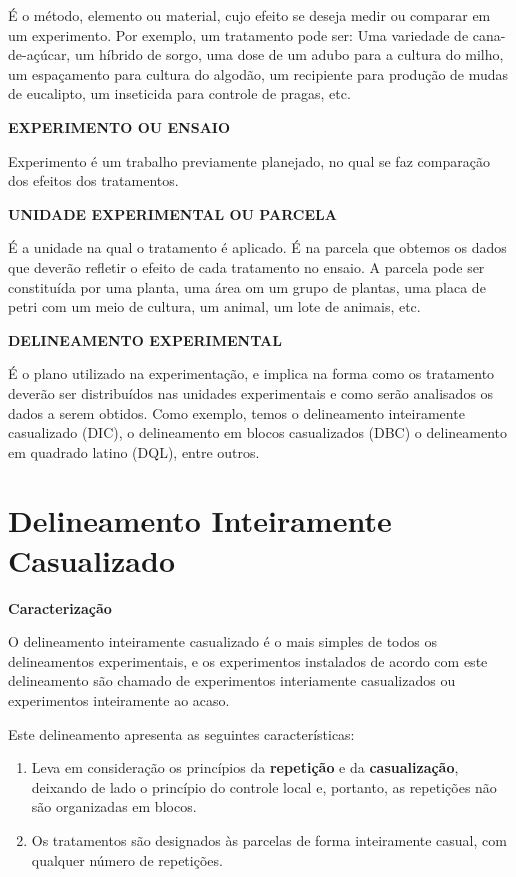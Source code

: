 \documentclass[
]{book}
\begin{document}
É o método, elemento ou material, cujo efeito se deseja medir ou comparar em um experimento. Por exemplo, um tratamento pode ser: Uma variedade de cana-de-açúcar, um híbrido de sorgo, uma dose de um adubo para a cultura do milho, um espaçamento para cultura do algodão, um recipiente para produção de mudas de eucalipto, um inseticida para controle de pragas, etc.

\textbf{EXPERIMENTO OU ENSAIO}

Experimento é um trabalho previamente planejado, no qual se faz comparação dos efeitos dos tratamentos.

\textbf{UNIDADE EXPERIMENTAL OU PARCELA}

É a unidade na qual o tratamento é aplicado. É na parcela que obtemos os dados que deverão refletir o efeito de cada tratamento no ensaio. A parcela pode ser constituída por uma planta, uma área om um grupo de plantas, uma placa de petri com um meio de cultura, um animal, um lote de animais, etc.

\textbf{DELINEAMENTO EXPERIMENTAL}

É o plano utilizado na experimentação, e implica na forma como os tratamento deverão ser distribuídos nas unidades experimentais e como serão analisados os dados a serem obtidos. Como exemplo, temos o delineamento inteiramente casualizado (DIC), o delineamento em blocos casualizados (DBC) o delineamento em quadrado latino (DQL), entre outros.

\hypertarget{delineamento-inteiramente-casualizado}{%
\chapter{Delineamento Inteiramente Casualizado}\label{delineamento-inteiramente-casualizado}}

\textbf{Caracterização}

O delineamento inteiramente casualizado é o mais simples de todos os delineamentos experimentais, e os experimentos instalados de acordo com este delineamento são chamado de experimentos interiamente casualizados ou experimentos inteiramente ao acaso.

Este delineamento apresenta as seguintes características:

\begin{enumerate}
\def\labelenumi{\arabic{enumi}.}
\item
  Leva em consideração os princípios da \textbf{repetição} e da \textbf{casualização}, deixando de lado o princípio do controle local e, portanto, as repetições não são organizadas em blocos.
\item
  Os tratamentos são designados às parcelas de forma inteiramente casual, com qualquer número de repetições.
\end{enumerate}
\end{document}
